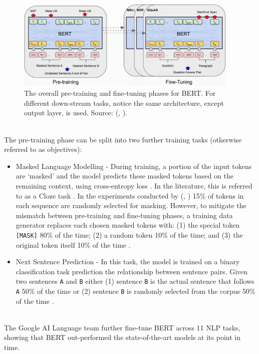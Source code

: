 \documentclass[10pt,oneside]{report}
\renewcommand{\citet}[1]{\citeauthor{#1}, \citeyear{#1}}
\begin{document}
\begin{figure}[htbp]
    \centering
    \includegraphics[width=0.95\textwidth]{BERT1.png}
    \caption{The overall pre-training and fine-tuning phases for BERT. For different down-stream tasks, notice the same architecture, except output layer, is used. Source: (\citet{devlin2019bert}).}\label{fig:bert1}
\end{figure}

\textbf{}\\ The pre-training phase can be split into two further training tasks (otherwise referred to as objectives):
\begin{itemize}
\item  Masked Language Modelling - During training, a portion of the input tokens are `masked' and the model predicts these masked tokens based on the remaining context, using cross-entropy loss \cite{zhang2018generalized}. In the literature, this is referred to as a Cloze task \cite{taylor1953cloze}. In the experiments conducted by (\citet{devlin2019bert}) 15\% of tokens in each sequence are randomly selected for masking. However, to mitigate the mismatch between pre-training and fine-tuning phases, a training data generator replaces each chosen masked tokens with: (1) the special token \texttt{[MASK]} 80\% of the time; (2) a random token 10\% of the time; and (3) the original token itself 10\% of the time \cite{devlin2019bert}.
    \item Next Sentence Prediction - In this task, the model is trained on a binary classification task prediction the relationship between sentence pairs. Given two sentences \texttt{A} and \texttt{B} either (1) sentence \texttt{B} is the actual sentence that follows \texttt{A} 50\% of the time or (2) sentence \texttt{B} is randomly selected from the corpus 50\% of the time \cite{devlin2019bert}. 
\end{itemize}

\textbf{}\\ The Google AI Language team further fine-tune BERT across 11 NLP tasks, showing that BERT out-performed the state-of-the-art models at its point in time.
\end{document}
